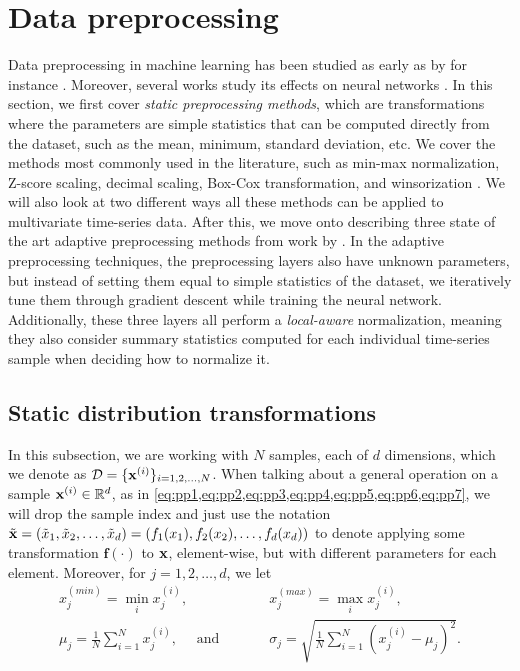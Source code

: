 \documentclass{statsmsc}
\begin{document}
{%

\section{Data preprocessing}%
\label{sec:Data preprocessing}

Data preprocessing in machine learning has been studied as early
as \citeyear{preprocess_origin} by for instance \citeauthor{preprocess_origin}.
Moreover, several works study its effects on neural networks \citep{stanislav, nawi, singh, hassan}.
In this section, we first cover \textit{static preprocessing methods}, which
are transformations where the parameters are simple statistics that can be
computed directly
from the dataset, such as the mean, minimum, standard deviation, etc.
We cover the methods most commonly used in the literature, such as min-max
normalization, Z-score scaling, decimal scaling, Box-Cox transformation,
and winsorization \citep{stanislav, nawi, singh, hassan, winsorization}.
We will also look at two different ways all these methods can be applied to multivariate
time-series data.
%
After this, we move onto describing three state of the art adaptive
preprocessing methods from work by \cite{dain,rdain,bin}.
In the adaptive preprocessing techniques, the preprocessing layers also have
unknown parameters, but instead of setting them equal to simple statistics of
the dataset, we iteratively tune them through gradient descent while training the
neural network. Additionally, these three layers all
perform a \textit{local-aware} normalization, meaning they also consider
summary statistics computed for each individual time-series sample when
deciding how to normalize it.

\subsection{Static distribution transformations}%
\label{sub:Static distribution transformations}

In this subsection, we are working with $N$ samples, each of $d$ dimensions, which we
denote as $\mathcal{D}=\{\mathbf{x}^{(i)} \}_{i=1,2,\dots,N}$. When talking about a general operation
on a sample $\mathbf{x}^{(i)}\in\mathbb{R}^d$, as in \cref{eq:pp1,eq:pp2,eq:pp3,eq:pp4,eq:pp5,eq:pp6,eq:pp7},
we will drop the sample index and just use the notation
$\tilde{\mathbf{x}}=\left(\tilde{x}_1,\tilde{x}_2,\dots,\tilde{x}_d \right)
=(f_1(x_1), f_2(x_2),\dots,f_d(x_d))$ to denote applying some transformation $\mathbf{f}(\cdot)$ to
$\mathbf{x}$, element-wise, but with different parameters for each element.
Moreover, for $j=1,2,\dots,d$, we let
\begin{align}
    x_j^{(min)}=\min_i x^{(i)}_j,  \qquad\qquad&\quad
    x_j^{(max)}=\max_i x^{(i)}_j, \nonumber\\
    \mu_j = \frac{1}{N} \sum^{N}_{i=1} x^{(i)}_j, \quad
    \textrm{ and }&\quad
    \sigma_j = \sqrt{\frac{1}{N} \sum^{N}_{i=1} \left( x^{(i)}_j - \mu_j\right)^2}.
\end{align}

}
\end{document}

